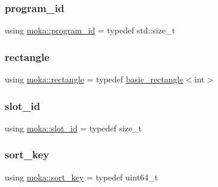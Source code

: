 \mbox{\label{namespacemoka_a2384dba7b6a57a9ae52567eefd6e177e}} 
\subsubsection{\texorpdfstring{program\_id}{program\_id}}
{\footnotesize\ttfamily using \mbox{\hyperlink{namespacemoka_a2384dba7b6a57a9ae52567eefd6e177e}{moka\+::program\+\_\+id}} = typedef std\+::size\+\_\+t}

\mbox{\label{namespacemoka_ab5e90635f0a0441cc99f2328bc34500d}} 
\subsubsection{\texorpdfstring{rectangle}{rectangle}}
{\footnotesize\ttfamily using \mbox{\hyperlink{namespacemoka_ab5e90635f0a0441cc99f2328bc34500d}{moka\+::rectangle}} = typedef \mbox{\hyperlink{structmoka_1_1basic__rectangle}{basic\+\_\+rectangle}}$<$int$>$}

\mbox{\label{namespacemoka_a959d3112313fb589684e8b1e3df66385}} 
\subsubsection{\texorpdfstring{slot\_id}{slot\_id}}
{\footnotesize\ttfamily using \mbox{\hyperlink{namespacemoka_a959d3112313fb589684e8b1e3df66385}{moka\+::slot\+\_\+id}} = typedef size\+\_\+t}

\mbox{\label{namespacemoka_afa30a616e67b83113ebdb857555cf2bb}} 
\subsubsection{\texorpdfstring{sort\_key}{sort\_key}}
{\footnotesize\ttfamily using \mbox{\hyperlink{namespacemoka_afa30a616e67b83113ebdb857555cf2bb}{moka\+::sort\+\_\+key}} = typedef uint64\+\_\+t}

\mbox{\label{namespacemoka_a562063640e8ad24ef94c1be0fd9079cf}} 
